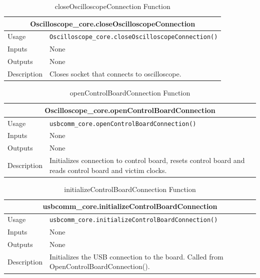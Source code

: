 \documentclass{llncs}
\numberwithin{algorithm}{chapter}
\begin{document}
\begin{table}[H]
\caption{closeOscilloscopeConnection Function}
\begin{tabular}{ |p{2cm}||p{11cm}|  }
 \hline
 \multicolumn{2}{|c|}{\cellcolor{teal}\textbf{Oscilloscope\_core.closeOscilloscopeConnection}} \\
 \hline
 Usage & \texttt{Oscilloscope\_core.closeOscilloscopeConnection()}\\ \hline
 Inputs & None \\ \hline
 Outputs &  None \\ \hline
 Description & Closes socket that connects to oscilloscope. \\ \hline
\end{tabular}
\end{table}

\begin{table}[H]
\caption{openControlBoardConnection Function}
\begin{tabular}{ |p{2cm}||p{11cm}|  }
 \hline
 \multicolumn{2}{|c|}{\cellcolor{teal}\textbf{Oscilloscope\_core.openControlBoardConnection}} \\
 \hline
 Usage & \texttt{usbcomm\_core.openControlBoardConnection()}\\ \hline
 Inputs & None \\ \hline
 Outputs &  None \\ \hline
 Description & Initializes connection to control board, resets control board and reads control board and victim clocks. \\ \hline
\end{tabular}
\end{table}

\begin{table}[H]
\caption{initializeControlBoardConnection Function}
\begin{tabular}{ |p{2cm}||p{11cm}|  }
 \hline
 \multicolumn{2}{|c|}{\cellcolor{teal}\textbf{usbcomm\_core.initializeControlBoardConnection}} \\
 \hline
 Usage & \texttt{usbcomm\_core.initializeControlBoardConnection()}\\ \hline
 Inputs & None \\ \hline
 Outputs &  None \\ \hline
 Description & Initializes the USB connection to the board.
Called from OpenControlBoardConnection(). \\ \hline
\end{tabular}
\end{table}
\end{document}
